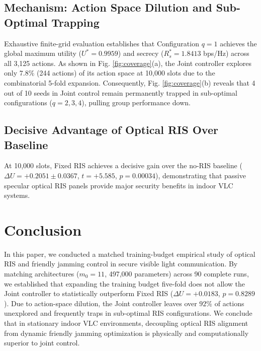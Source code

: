 \documentclass[journal,10pt,twocolumn]{IEEEtran}
\begin{document}
\subsection{Mechanism: Action Space Dilution and Sub-Optimal Trapping}
Exhaustive finite-grid evaluation establishes that Configuration $q=1$ achieves the global maximum utility ($U^* = 0.9959$) and secrecy ($R_s^* = 1.8413$ bps/Hz) across all 3,125 actions. As shown in Fig. \ref{fig:coverage}(a), the Joint controller explores only $7.8\%$ (244 actions) of its action space at 10,000 slots due to the combinatorial 5-fold expansion. Consequently, Fig. \ref{fig:coverage}(b) reveals that 4 out of 10 seeds in Joint control remain permanently trapped in sub-optimal configurations ($q=2, 3, 4$), pulling group performance down.

\subsection{Decisive Advantage of Optical RIS Over Baseline}
At 10,000 slots, Fixed RIS achieves a decisive gain over the no-RIS baseline ($\Delta U = +0.2051 \pm 0.0367$, $t = +5.585$, $p = 0.00034$), demonstrating that passive specular optical RIS panels provide major security benefits in indoor VLC systems.

\section{Conclusion}
In this paper, we conducted a matched training-budget empirical study of optical RIS and friendly jamming control in secure visible light communication. By matching architectures ($m_0=11$, 497,000 parameters) across 90 complete runs, we established that expanding the training budget five-fold does not allow the Joint controller to statistically outperform Fixed RIS ($\Delta U = +0.0183$, $p = 0.8289$). Due to action-space dilution, the Joint controller leaves over $92\%$ of actions unexplored and frequently traps in sub-optimal RIS configurations. We conclude that in stationary indoor VLC environments, decoupling optical RIS alignment from dynamic friendly jamming optimization is physically and computationally superior to joint control.



\end{document}
